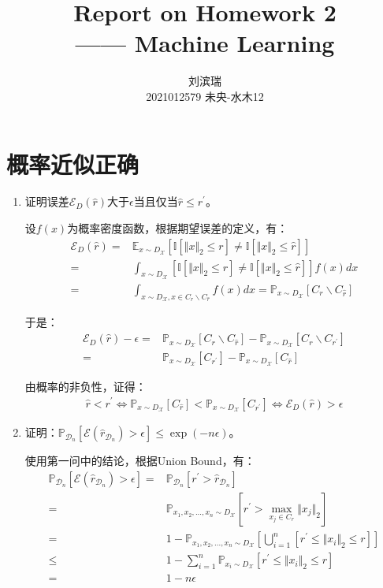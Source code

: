 \documentclass[12pt, a4paper]{article}
\title{{\Huge{\textbf{Report on Homework 2 \\}}} —— Machine Learning}
\author{刘滨瑞 \\ 2021012579 \quad 未央-水木12}
\newcommand{\under}[1]{\mathop{#1}\limits_}
\newcommand{\norm}[1]{{\Vert #1 \Vert_2}}
\newcommand{\expect}{{\mathbb{E}}}
\newcommand{\unit}{{\mathbb{I}}}
\newcommand{\prob}{{\mathbb{P}}}
\newcommand{\EE}{{\mathcal{E}}}
\newcommand{\XX}{{\mathcal{X}}}
\newcommand{\DD}{{\mathcal{D}}}
\newcommand{\rh}{{\widehat{r}}}
\newcommand{\rp}{{r^\prime}}
\begin{document}
\maketitle


\section{概率近似正确}

    \begin{enumerate}

    \item 证明误差$\EE_{D} (\rh)$大于$\epsilon$当且仅当$\rh \le \rp$。

        设$f(x)$为概率密度函数，根据期望误差的定义，有：
        \begin{align*}
        \EE_{D}(\rh)
        =& \expect_{x \sim D_\XX}[\unit[\norm{x} \le r] \ne \unit[\norm{x} \le \rh]] \\
        =& \int_{x \sim D_\XX}[\unit[\norm{x} \le r] \ne \unit[\norm{x} \le \rh]] f(x) dx \\
        =& \int_{x \sim D_\XX, x \in C_r \backslash C_\rh} f(x) dx = \prob_{x \sim D_\XX}[C_r \backslash C_\rh]
        \end{align*}

        于是：
        \begin{align*}
        \EE_{D} (\rh) - \epsilon
        =& \prob_{x \sim D_\XX}[C_r \backslash C_\rh] - \prob_{x \sim D_\XX}[C_r \backslash C_\rp] \\
        =& \prob_{x \sim D_\XX}[C_\rp] - \prob_{x \sim D_\XX}[C_\rh]
        \end{align*}

        由概率的非负性，证得：
        \begin{align*}
        \rh < \rp \iff \prob_{x \sim D_\XX}[C_\rh] < \prob_{x \sim D_\XX}[C_\rp] \iff \EE_{D}(\rh) > \epsilon
        \end{align*}

    \item 证明：$\prob_{\DD_n}[\EE(\rh_{\DD_n}) > \epsilon] \le \exp(-n \epsilon)$。

        使用第一问中的结论，根据Union Bound，有：
        \begin{align*}
        \prob_{\DD_n}[\EE(\rh_{\DD_n}) > \epsilon]
        =& \prob_{\DD_n}[\rp > \rh_{\DD_n}] \\
        =& \prob_{x_1, x_2, ..., x_n \sim D_\XX}[\rp > \under{\max}{x_j \in C_r} \norm{x_j}] \\
        =& 1 - \prob_{x_1, x_2, ..., x_n \sim D_\XX}[\bigcup_{i = 1}^{n} [\rp \le \norm{x_i} \le r]] \\
        \le& 1 - \sum_{i = 1}^{n} \prob_{x_i \sim D_\XX}[\rp \le \norm{x_i} \le r] \\
        =& 1 - n \epsilon
        \end{align*}


\end{enumerate}
\end{document}
